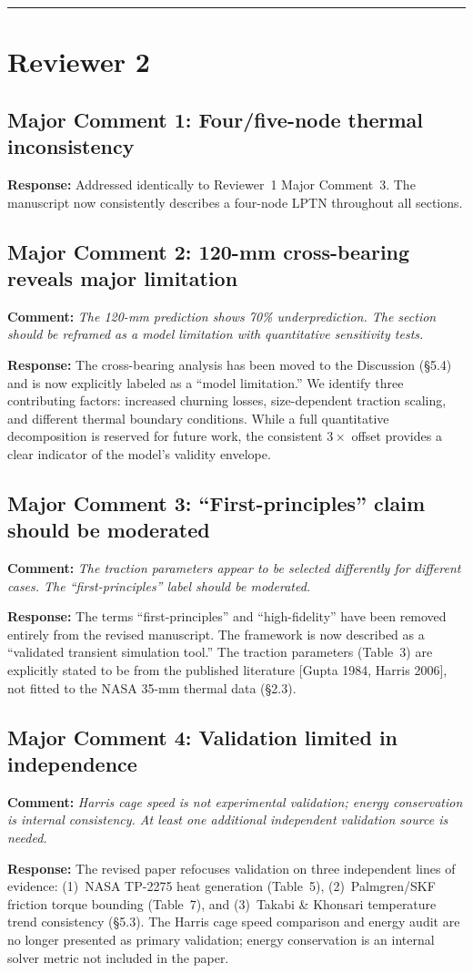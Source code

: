 \documentclass[11pt]{article}
\newcommand{\reviewer}[1]{\subsection*{#1}}
\newcommand{\comment}[1]{\textbf{Comment:} \textit{#1}\par\medskip}
\newcommand{\response}[1]{\textbf{Response:} \textcolor{response}{#1}\par\bigskip}
\begin{document}
\bigskip
\noindent\rule{\textwidth}{0.4pt}

\section*{Reviewer 2}

\reviewer{Major Comment 1: Four/five-node thermal inconsistency}

\response{Addressed identically to Reviewer~1 Major Comment~3. The manuscript now consistently describes a four-node LPTN throughout all sections.}


\reviewer{Major Comment 2: 120-mm cross-bearing reveals major limitation}

\comment{The 120-mm prediction shows 70\% underprediction. The section should be reframed as a model limitation with quantitative sensitivity tests.}

\response{The cross-bearing analysis has been moved to the Discussion (\S5.4) and is now explicitly labeled as a ``model limitation.'' We identify three contributing factors: increased churning losses, size-dependent traction scaling, and different thermal boundary conditions. While a full quantitative decomposition is reserved for future work, the consistent $3\times$ offset provides a clear indicator of the model's validity envelope.}


\reviewer{Major Comment 3: ``First-principles'' claim should be moderated}

\comment{The traction parameters appear to be selected differently for different cases. The ``first-principles'' label should be moderated.}

\response{The terms ``first-principles'' and ``high-fidelity'' have been removed entirely from the revised manuscript. The framework is now described as a ``validated transient simulation tool.'' The traction parameters (Table~3) are explicitly stated to be from the published literature [Gupta 1984, Harris 2006], not fitted to the NASA 35-mm thermal data (\S2.3).}


\reviewer{Major Comment 4: Validation limited in independence}

\comment{Harris cage speed is not experimental validation; energy conservation is internal consistency. At least one additional independent validation source is needed.}

\response{The revised paper refocuses validation on three independent lines of evidence: (1)~NASA TP-2275 heat generation (Table~5), (2)~Palmgren/SKF friction torque bounding (Table~7), and (3)~Takabi \& Khonsari temperature trend consistency (\S5.3). The Harris cage speed comparison and energy audit are no longer presented as primary validation; energy conservation is an internal solver metric not included in the paper.}
\end{document}
